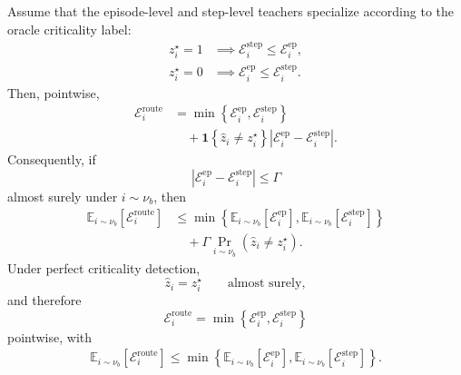 \documentclass{llmxive}
\begin{document}
\begin{proposition}
\label{prop:routing_regret}
Assume that the episode-level and step-level teachers specialize according
to the oracle criticality label:
\begin{equation}
\begin{aligned}
 z_i^\star=1
 &\implies
 \mathcal E_i^{\mathrm{step}}
 \le
 \mathcal E_i^{\mathrm{ep}},
 \\
 z_i^\star=0
 &\implies
 \mathcal E_i^{\mathrm{ep}}
 \le
 \mathcal E_i^{\mathrm{step}}.
\end{aligned}
\label{eq:routing_specialization}
\end{equation}
Then, pointwise,
\begin{equation}
\begin{aligned}
 \mathcal E_i^{\mathrm{route}}
 &=
 \min
 \left\{
   \mathcal E_i^{\mathrm{ep}},
   \mathcal E_i^{\mathrm{step}}
 \right\}
 \\
 &\quad+
 \mathbf 1
 \left\{
   \widehat z_i\ne z_i^\star
 \right\}
 \left|
   \mathcal E_i^{\mathrm{ep}}
   -
   \mathcal E_i^{\mathrm{step}}
 \right|.
\end{aligned}
\label{eq:routing_regret_identity}
\end{equation}
Consequently, if
\begin{equation}
 \left|
   \mathcal E_i^{\mathrm{ep}}
   -
   \mathcal E_i^{\mathrm{step}}
 \right|
 \le
 \Gamma
\label{eq:routing_gap_bound}
\end{equation}
almost surely under \(i\sim\nu_b\), then
\begin{equation}
\begin{aligned}
 \mathbb E_{i\sim\nu_b}
 \left[
   \mathcal E_i^{\mathrm{route}}
 \right]
 &\le
 \min
 \left\{
   \mathbb E_{i\sim\nu_b}
   \left[
     \mathcal E_i^{\mathrm{ep}}
   \right],
   \mathbb E_{i\sim\nu_b}
   \left[
     \mathcal E_i^{\mathrm{step}}
   \right]
 \right\}
 \\
 &\quad+
 \Gamma
 \Pr_{i\sim\nu_b}
 \left(
   \widehat z_i\ne z_i^\star
 \right).
\end{aligned}
\label{eq:routing_expected_bound}
\end{equation}
Under perfect criticality detection,
\begin{equation*}
 \widehat z_i=z_i^\star
 \qquad
 \text{almost surely},
\end{equation*}
and therefore
\begin{equation*}
 \mathcal E_i^{\mathrm{route}}
 =
 \min
 \left\{
   \mathcal E_i^{\mathrm{ep}},
   \mathcal E_i^{\mathrm{step}}
 \right\}
\end{equation*}
pointwise, with
\begin{equation*}
\begin{aligned}
 \mathbb E_{i\sim\nu_b}
 \left[
   \mathcal E_i^{\mathrm{route}}
 \right]
 \le
 \min
 \left\{
   \mathbb E_{i\sim\nu_b}
   \left[
     \mathcal E_i^{\mathrm{ep}}
   \right],
   \mathbb E_{i\sim\nu_b}
   \left[
     \mathcal E_i^{\mathrm{step}}
   \right]
 \right\}.
\end{aligned}
\end{equation*}
\end{proposition}
\end{document}
